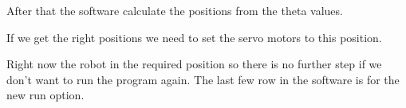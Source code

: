 		
		
		\hspace{15pt}After that the software calculate the positions from the theta values.
		
		
		
		\hspace{15pt}If we get the right positions we need to set the servo motors to this position.
		
		
		
		\hspace{15pt}Right now the robot in the required position so there is no further step if we don't want to run the program again. The last few row in the software is for the new run option.
		
		
	
	